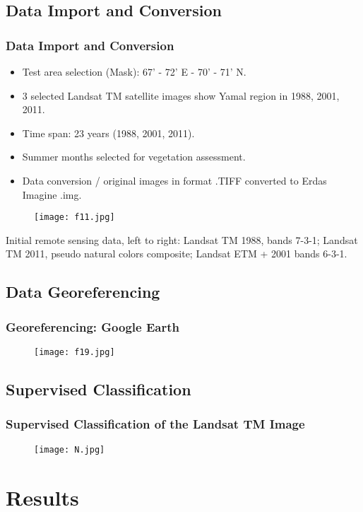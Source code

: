 \documentclass[pdflatex,compress,8pt,
	xcolor={dvipsnames,dvipsnames,svgnames,x11names,table},
	hyperref={colorlinks = true,
	breaklinks = true, 
	urlcolor = NavyBlue, 
	breaklinks = true}]{beamer}
\begin{document}
\subsection{Data Import and Conversion}
\begin{frame}\frametitle{Data Import and Conversion}
\begin{itemize}
        \item Test area selection (Mask): 67' - 72' E - 70' - 71' N. 
	\item 3 selected  Landsat TM satellite images show Yamal region in 1988, 2001, 2011.
	\item Time span: 23 years (1988, 2001, 2011). 
	\item Summer months selected for vegetation assessment. 
	\item Data conversion / original images in format .TIFF converted to Erdas Imagine .img.
\end{itemize}
\begin{figure}[H]
	\centering
		\texttt{[image: f11.jpg]}
\end{figure}
Initial remote sensing data, left to right: Landsat TM 1988, bands 7-3-1; Landsat TM 2011, pseudo natural colors composite; Landsat ETM + 2001 bands 6-3-1.
\end{frame}

\subsection{Data Georeferencing}
\begin{frame}\frametitle{Georeferencing: Google Earth}
\begin{figure}[H]
	\centering
		\texttt{[image: f19.jpg]}
\end{figure}
\end{frame}

\subsection{Supervised Classification}
\begin{frame}\frametitle{Supervised Classification of the Landsat TM Image}
\begin{figure}[H]
	\centering
		\texttt{[image: N.jpg]}
\end{figure}
\end{frame}

\section{Results}
\end{document}
